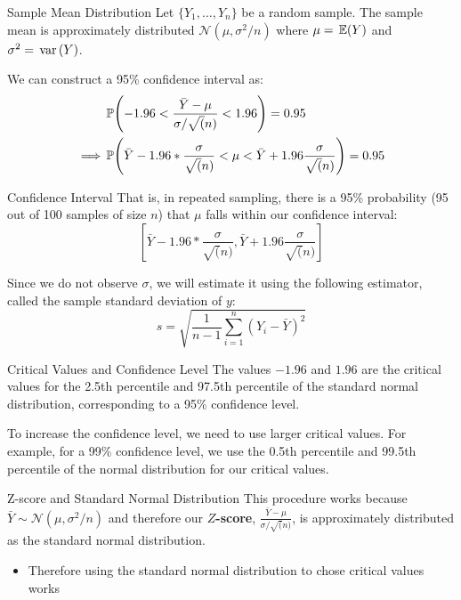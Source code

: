 \documentclass[aspectratio=169,t,11pt,table]{beamer}
\begin{document}
\begin{frame}{Sample Mean Distribution}
  Let $\{ Y_1, \dots, Y_n \}$ be a random sample. The sample mean is approximately distributed $\mathcal{N}(\mu, \sigma^2 / n)$ where $\mu = \expec{Y}$ and $\sigma^2 = \var{Y}$. 

  \pause
  We can construct a 95\% confidence interval as: 
  \begin{align*}
    &\P{-1.96 < \frac{\bar{Y} - \mu}{\sigma / \sqrt(n)} < 1.96} = 0.95 \\
    \implies &\P{\bar{Y} - 1.96 * \frac{\sigma}{\sqrt(n)} < \mu  < \bar{Y} + 1.96 \frac{\sigma}{\sqrt(n)}} = 0.95
  \end{align*}
\end{frame}

\begin{frame}{Confidence Interval}
  That is, in repeated sampling, there is a 95\% probability (95 out of 100 samples of size $n$) that $\mu$ falls within our confidence interval: 
  $$
    \left[
      \bar{Y} - 1.96 * \frac{\sigma}{\sqrt(n)}, 
      \bar{Y} + 1.96 \frac{\sigma}{\sqrt(n)}
    \right]
  $$

  \pause
  \bigskip
  Since we do not observe $\sigma$, we will estimate it using the following estimator, called the sample standard deviation of $y$:
  $$
    s = \sqrt{\frac{1}{n-1} \sum_{i=1}^n (Y_i - \bar{Y})^2}
  $$
\end{frame}

\begin{frame}{Critical Values and Confidence Level}
  The values $-1.96$ and $1.96$ are the critical values for the 2.5th percentile and 97.5th percentile of the standard normal distribution, corresponding to a 95\% confidence level.

  \pause
  \bigskip
  To increase the confidence level, we need to use larger critical values. For example, for a 99\% confidence level, we use the 0.5th percentile and 99.5th percentile of the normal distribution for our critical values.
\end{frame}

\begin{frame}{Z-score and Standard Normal Distribution}
  This procedure works because $\bar{Y} \sim \mathcal{N}(\mu, \sigma^2/n)$ and therefore our \textbf{$Z$-score}, $\frac{\bar{Y} - \mu}{\sigma / \sqrt(n)}$, is approximately distributed as the standard normal distribution.
  \begin{itemize}
    \item Therefore using the standard normal distribution to chose critical values works
  \end{itemize}
\end{frame}
\end{document}
